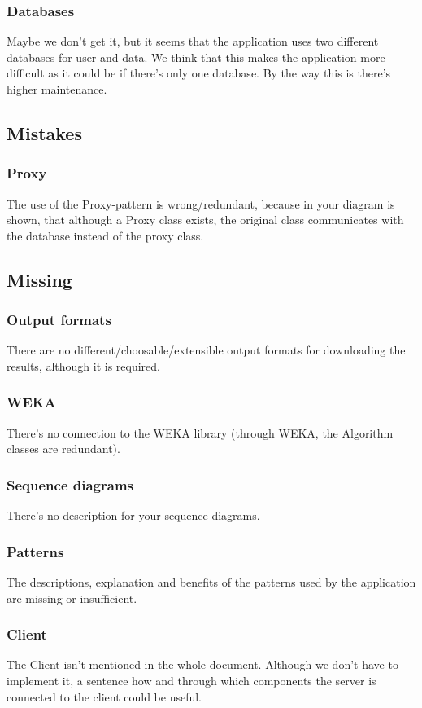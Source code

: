 \documentclass{article}
\begin{document}
\subsubsection{Databases}
Maybe we don't get it, but it seems that the application uses two different databases for user and data. We think that this makes the application more difficult as it could be if there's only one database. By the way this is there's higher maintenance.
\subsection{Mistakes}
\subsubsection{Proxy}
The use of the Proxy-pattern is wrong/redundant, because in your diagram is shown, that although a Proxy class exists, the original class communicates with the database instead of the proxy class.
\subsection{Missing}
\subsubsection{Output formats}
There are no different/choosable/extensible output formats for downloading the results, although it is required.
\subsubsection{WEKA}
There's no connection to the WEKA library (through WEKA, the Algorithm classes are redundant).
\subsubsection{Sequence diagrams}
There's no description for your sequence diagrams.
\subsubsection{Patterns}
The descriptions, explanation and benefits of the patterns used by the application are missing or insufficient.
\subsubsection{Client}
The Client isn't mentioned in the whole document. Although we don't have to implement it, a sentence how and through which components the server is connected to the client could be useful.
\end{document}
